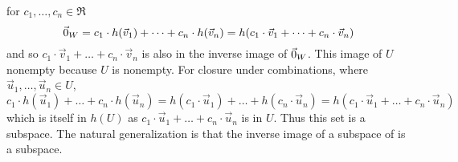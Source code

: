 \begin{exercises}
\begin{answer}
\begin{exparts}
          for \( c_1,\ldots,c_n\in\Re \)
          \begin{equation*}
            \vec{0}_W=c_1\cdot h(\vec{v}_1)+\dots+c_n\cdot h(\vec{v}_n)
            =h(c_1\cdot \vec{v}_1+\dots+c_n\cdot \vec{v}_n)
          \end{equation*}
          and so \( c_1\cdot \vec{v}_1+\dots+c_n\cdot \vec{v}_n \) is also in
          the inverse image of \( \vec{0}_W \).
        \partsitem This image of \( U \) nonempty because \( U \) is nonempty.
          For closure under combinations, 
          where \( \vec{u}_1,\ldots,\vec{u}_n\in U \),
          \begin{equation*}
            c_1\cdot h(\vec{u}_1)+\dots+c_n\cdot h(\vec{u}_n)
            =
            h(c_1\cdot \vec{u}_1)+\dots+h(c_n\cdot \vec{u}_n)
            =
            h(c_1\cdot \vec{u}_1+\dots+c_n\cdot \vec{u}_n)
          \end{equation*}
          which is itself in \( h(U) \) as
          \( c_1\cdot \vec{u}_1+\dots+c_n\cdot \vec{u}_n \) is in \( U \).
          Thus this set is a subspace.
        \partsitem The natural generalization is that the inverse image of a
          subspace of is a subspace.


\end{exparts}
\end{answer}
\end{exercises}
